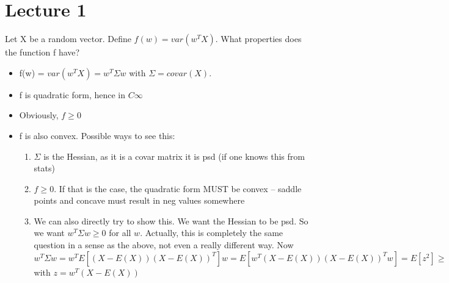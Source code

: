 \documentclass[a4paper]{article}
\begin{document}






\section{Lecture 1}
Let X be a random vector. Define $f(w) = var(w^T X)$. What properties does the function f have?
\begin{itemize}
    \item f(w) = $var(w^T X) = w^T \Sigma w$ with $\Sigma = covar(X)$. 
    \item f is quadratic form, hence in $C\infty$
    \item Obviously, $f \geq 0$
    \item f is also convex. Possible ways to see this:
\begin{enumerate}
    \item $\Sigma$ is the Hessian, as it is a covar matrix it is psd (if one knows this from stats)
    \item $f \geq 0$. If that is the case, the quadratic form MUST be convex -- saddle points and concave must result in neg values somewhere
    \item We can also directly try to show this. We want the Hessian to be psd. So we want $w^T \Sigma w \geq 0$ for all $w$. Actually, this is completely the same question in a sense as the above, not even a really different way. Now
    $$w^T \Sigma w = w^T E[ (X - E(X)) (X - E(X))^T] w = 
    E[ w^T (X - E(X)) (X - E(X))^T w] = E[z^2] \geq 
    $$
    with $z =  w^T (X - E(X))$
\end{enumerate}
    
\end{itemize}
\end{document}
